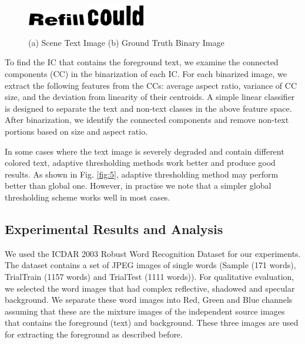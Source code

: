 \begin{figure}[p]
{\includegraphics[height=.5in,width=1in]{chap4/ground/4.eps}
\includegraphics[height=.5in,width=1in]{chap4/ground/5.eps}
}
\caption
{(a) Scene Text Image (b) Ground Truth Binary Image}
\label{fig:ground}
\end{figure}














To find the IC that contains the foreground text, we examine the connected components (CC) in the 
binarization of each IC. For each binarized image, we extract the following features from the CCs: 
average aspect ratio, variance of  CC size, and the deviation from linearity of their centroids.
A simple linear classifier is designed to separate the text and non-text classes in the above feature space.
After binarization, we identify the
connected components and remove non-text portions based on size and aspect ratio.

In some cases where the text image is severely degraded and contain different colored text,
adaptive thresholding methods work better and produce good results. As shown in Fig. \ref{fig:5}, adaptive thresholding
method may perform better than global one. However, in practise we note that a simpler global thresholding
scheme works well in most cases.



\subsection{Experimental Results and Analysis}

We used the ICDAR 2003 Robust Word Recognition Dataset \cite{A15} for our experiments.
The dataset contains a set of JPEG images of single words (Sample (171 words), 
TrialTrain (1157 words) and TrialTest (1111 words)). For qualitative evaluation,
we selected the word images that had complex reflective, shadowed and specular background.  
We separate these word images into Red, Green and Blue channels
assuming that these are the mixture images of the independent source images
that contains the foreground (text) and background. These three images are used
for extracting the foreground as described before.

